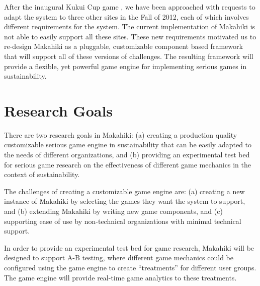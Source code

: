 \documentclass{acm_proc_article-sp}
\begin{document}
After the inaugural Kukui Cup game \cite{thekukuicup}, we have been approached with requests to adapt the system to three other sites in the Fall of 2012, each of which involves different requirements for the system. The current implementation of Makahiki is not able to easily support all these sites. These new requirements motivated us to re-design Makahiki as a pluggable, customizable component based framework that will support all of these versions of challenges.  The resulting framework will provide a flexible, yet powerful game engine for implementing serious games in sustainability.

\section{Research Goals}


There are two research goals in Makahiki: (a) creating a production quality customizable serious game engine in sustainability that can be easily adapted to the needs of different organizations, and (b) providing an experimental test bed for serious game research on the effectiveness of different game mechanics in the context of sustainability.

The challenges of creating a customizable game engine are:  (a) creating a new instance of Makahiki by selecting the games they want the system to support, and (b) extending Makahiki by writing new game components, and (c) supporting ease of use by non-technical organizations with minimal technical support.

In order to provide an experimental test bed for game research, Makahiki will be designed to support A-B testing, where different game mechanics could be configured using the game engine to create ``treatments'' for different user groups. The game engine will provide real-time game analytics to these treatments.
\end{document}
